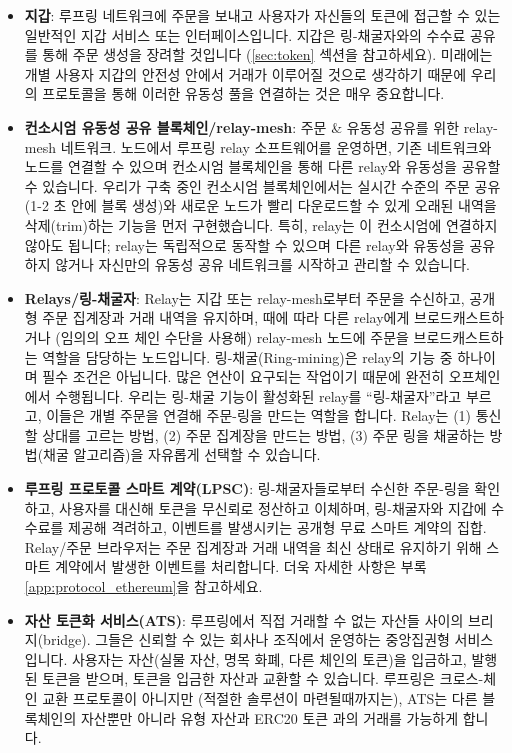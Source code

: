 \documentclass[UTF8,nofonts]{article}
\begin{document}
\begin{multicols}{2}
\begin{itemize}

\item \textbf{지갑}: 루프링 네트워크에 주문을 보내고 사용자가 자신들의 토큰에 접근할 수 있는 일반적인 지갑 서비스 또는 인터페이스입니다. 지갑은 링-채굴자와의 수수료 공유를 통해 주문 생성을 장려할 것입니다 (\ref{sec:token} 섹션을 참고하세요). 미래에는 개별 사용자 지갑의 안전성 안에서 거래가 이루어질 것으로 생각하기 때문에 우리의 프로토콜을 통해 이러한 유동성 풀을 연결하는 것은 매우 중요합니다.    

\item \textbf{컨소시엄 유동성 공유 블록체인/relay-mesh}: 주문 \& 유동성 공유를 위한 relay-mesh 네트워크. 노드에서 루프링 relay 소프트웨어를 운영하면, 기존 네트워크와 노드를 연결할 수 있으며 컨소시엄 블록체인을 통해 다른 relay와 유동성을 공유할 수 있습니다. 우리가 구축 중인 컨소시엄 블록체인에서는 실시간 수준의 주문 공유(1-2 초 안에 블록 생성)와 새로운 노드가 빨리 다운로드할 수 있게 오래된 내역을 삭제(trim)하는 기능을 먼저 구현했습니다. 특히, relay는 이 컨소시엄에 연결하지 않아도 됩니다; relay는 독립적으로 동작할 수 있으며 다른 relay와 유동성을 공유하지 않거나 자신만의 유동성 공유 네트워크를 시작하고 관리할 수 있습니다. 

\item \textbf{Relays/링-채굴자}: Relay는 지갑 또는 relay-mesh로부터 주문을 수신하고, 공개형 주문 집계장과 거래 내역을 유지하며, 때에 따라 다른 relay에게 브로드캐스트하거나 (임의의 오프 체인 수단을 사용해) relay-mesh 노드에 주문을 브로드캐스트하는 역할을 담당하는 노드입니다. 링-채굴(Ring-mining)은 relay의 기능 중 하나이며 필수 조건은 아닙니다. 많은 연산이 요구되는 작업이기 때문에 완전히 오프체인에서 수행됩니다. 우리는 링-채굴 기능이 활성화된 relay를 \enquote{링-채굴자}라고 부르고, 이들은 개별 주문을 연결해 주문-링을 만드는 역할을 합니다. Relay는 (1) 통신할 상대를 고르는 방법, (2) 주문 집계장을 만드는 방법, (3) 주문 링을 채굴하는 방법(채굴 알고리즘)을 자유롭게 선택할 수 있습니다.      

\item \textbf{루프링 프로토콜 스마트 계약(LPSC)}: 링-채굴자들로부터 수신한 주문-링을 확인하고, 사용자를 대신해 토큰을 무신뢰로 정산하고 이체하며, 링-채굴자와 지갑에 수수료를 제공해 격려하고, 이벤트를 발생시키는 공개형 무료 스마트 계약의 집합. Relay/주문 브라우저는 주문 집계장과 거래 내역을 최신 상태로 유지하기 위해 스마트 계약에서 발생한 이벤트를 처리합니다. 더욱 자세한 사항은 부록 \ref{app:protocol_ethereum}을 참고하세요.

\item \textbf{자산 토큰화 서비스(ATS)}: 루프링에서 직접 거래할 수 없는 자산들 사이의 브리지(bridge). 그들은 신뢰할 수 있는 회사나 조직에서 운영하는 중앙집권형 서비스입니다. 사용자는 자산(실물 자산, 명목 화폐, 다른 체인의 토큰)을 입금하고, 발행된 토큰을 받으며, 토큰을 입금한 자산과 교환할 수 있습니다. 루프링은 크로스-체인 교환 프로토콜이 아니지만 (적절한 솔루션이 마련될때까지는), ATS는 다른 블록체인의 자산뿐만 아니라 유형 자산과 ERC20 토큰 \cite{ERC20}과의 거래를 가능하게 합니다.


\end{itemize}
\end{multicols}
\end{document}
